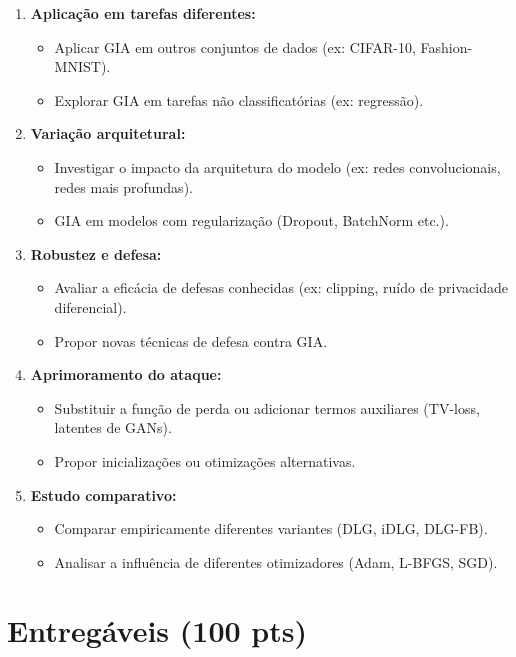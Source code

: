 \documentclass[12pt]{article}
\begin{document}
\begin{enumerate}[label=\textbf{\arabic*.}, nosep]
  \item \textbf{Aplicação em tarefas diferentes:}
        \begin{itemize}
          \item Aplicar GIA em outros conjuntos de dados (ex: CIFAR-10, Fashion-MNIST).
          \item Explorar GIA em tarefas não classificatórias (ex: regressão).
        \end{itemize}
  \item \textbf{Variação arquitetural:}
        \begin{itemize}
          \item Investigar o impacto da arquitetura do modelo (ex: redes convolucionais, redes mais profundas).
          \item GIA em modelos com regularização (Dropout, BatchNorm etc.).
        \end{itemize}
  \item \textbf{Robustez e defesa:}
        \begin{itemize}
          \item Avaliar a eficácia de defesas conhecidas (ex: clipping, ruído de privacidade diferencial).
          \item Propor novas técnicas de defesa contra GIA.
        \end{itemize}
  \item \textbf{Aprimoramento do ataque:}
        \begin{itemize}
          \item Substituir a função de perda ou adicionar termos auxiliares (TV-loss, latentes de GANs).
          \item Propor inicializações ou otimizações alternativas.
        \end{itemize}
  \item \textbf{Estudo comparativo:}
        \begin{itemize}
          \item Comparar empiricamente diferentes variantes (DLG, iDLG, DLG-FB).
          \item Analisar a influência de diferentes otimizadores (Adam, L-BFGS, SGD).
        \end{itemize}
\end{enumerate}

\section*{Entregáveis (100 pts)}
\end{document}
